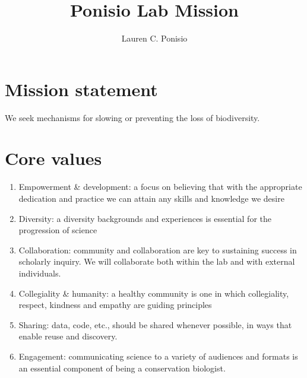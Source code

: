 \documentclass[12pt]{article}
\title{Ponisio Lab Mission}
\author{Lauren C. Ponisio}
\begin{document}
\maketitle

\section{Mission statement}
We seek mechanisms for slowing or preventing the loss of biodiversity.

\section{Core values}

\begin{enumerate}
\item Empowerment \& development: a focus on believing that with the
  appropriate dedication and practice we can attain any skills and
  knowledge we desire
\item Diversity: a diversity backgrounds and experiences is essential
  for the progression of science
\item Collaboration: community and collaboration are key to sustaining
  success in scholarly inquiry. We will collaborate both within the
  lab and with external individuals.
\item Collegiality \& humanity: a healthy community is one in which
  collegiality, respect, kindness and empathy are guiding principles
\item Sharing: data, code, etc., should be shared whenever possible,
  in ways that enable reuse and discovery.
\item Engagement: communicating science to a variety of audiences and
  formats is an essential component of being a conservation biologist.
\end{enumerate}
\end{document}
